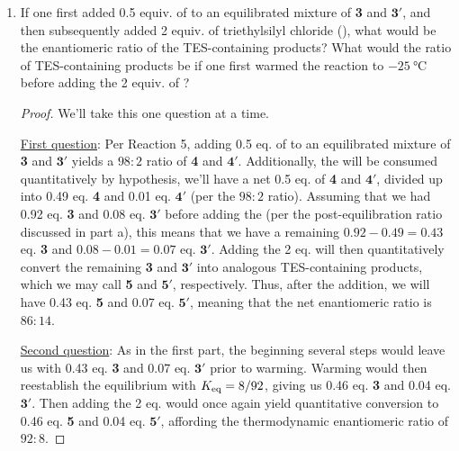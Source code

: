 \documentclass[../psets.tex]{subfiles}
\begin{document}
\begin{enumerate}
\begin{enumerate}
\begin{proof}
            \begin{align*}
                \Delta\Delta G^\ddagger &= -RT\ln(\frac{k_{\bm{34}}}{k_{\bm{3'4'}}})\\
                &= -RT\ln(\frac{[\bm{4}]}{[\bm{4'}]})\\
                &= -\left( \SI[per-mode=fraction]{1.9872e-3}{\kilo\calorie\per\mole\per\kelvin} \right)\left( \SI{195}{\kelvin} \right)\ln(\frac{91}{9})\\
                \Aboxed{\Delta\Delta G^\ddagger &= -\kcal{0.9}}
            \end{align*}
        \end{proof}
        \item If one first added 0.5 equiv. of  to an equilibrated mixture of \textbf{3} and $\bm{3'}$, and then subsequently added 2 equiv. of triethylsilyl chloride (), what would be the enantiomeric ratio of the TES-containing products? What would the ratio of TES-containing products be if one first warmed the reaction to $-\SI{25}{\celsius}$ before adding the 2 equiv. of ?
        \begin{proof}
            We'll take this one question at a time.\par
            \underline{First question}: Per Reaction 5, adding 0.5 eq. of  to an equilibrated mixture of \textbf{3} and $\bm{3'}$ yields a $98:2$ ratio of \textbf{4} and $\bm{4'}$. Additionally, the  will be consumed quantitatively by hypothesis, we'll have a net 0.5 eq. of \textbf{4} and $\bm{4'}$, divided up into 0.49 eq. \textbf{4} and 0.01 eq. $\bm{4'}$ (per the $98:2$ ratio). Assuming that we had 0.92 eq. \textbf{3} and 0.08 eq. $\bm{3'}$ before adding the  (per the post-equilibration ratio discussed in part a), this means that we have a remaining $0.92-0.49=0.43$ eq. \textbf{3} and $0.08-0.01=0.07$ eq. $\bm{3'}$. Adding the 2 eq.  will then quantitatively convert the remaining \textbf{3} and $\bm{3'}$ into analogous TES-containing products, which we may call \textbf{5} and $\bm{5'}$, respectively. Thus, after the  addition, we will have 0.43 eq. \textbf{5} and 0.07 eq. $\bm{5'}$, meaning that the net enantiomeric ratio is $\boxed{86:14}$.\par
            \underline{Second question}: As in the first part, the beginning several steps would leave us with 0.43 eq. \textbf{3} and 0.07 eq. $\bm{3'}$ prior to warming. Warming would then reestablish the equilibrium with $K_\textup{eq}=8/92$, giving us 0.46 eq. \textbf{3} and 0.04 eq. $\bm{3'}$. Then adding the 2 eq.  would once again yield quantitative conversion to 0.46 eq. \textbf{5} and 0.04 eq. $\bm{5'}$, affording the thermodynamic enantiomeric ratio of $\boxed{92:8}$.

\end{proof}
\end{enumerate}
\end{enumerate}
\end{document}
